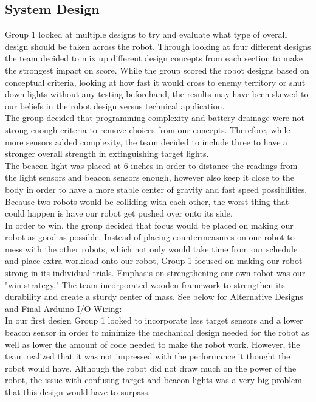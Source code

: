 \documentclass{article}
\begin{document}
\subsection{System Design}
Group 1 looked at multiple designs to try and evaluate what type of overall design should be taken across the robot. Through looking at four different designs the team decided to mix up different design concepts from each section to make the strongest impact on score. While the group scored the robot designs based on conceptual criteria, looking at how fast it would cross to enemy territory or shut down lights without any testing beforehand, the results may have been skewed to our beliefs in the robot design versus technical application. \\

The group decided that programming complexity and battery drainage were not strong enough criteria to remove choices from our concepts. Therefore, while more sensors added complexity, the team decided to include three to have a stronger overall strength in extinguishing target lights. \\

The beacon light was placed at 6 inches in order to distance the readings from the light sensors and beacon sensors enough, however also keep it close to the body in order to have a more stable center of gravity and fast speed possibilities. Because two robots would be colliding with each other, the worst thing that could happen is have our robot get pushed over onto its side. \\

In order to win, the group decided that focus would be placed on making our robot as good as possible. Instead of placing countermeasures on our robot to mess with the other robots, which not only would take time from our schedule and place extra workload onto our robot, Group 1 focused on making our robot strong in its individual trials. Emphasis on strengthening our own robot was our "win strategy." The team incorporated wooden framework to strengthen its durability and create a sturdy center of mass. See below for Alternative Designs and Final Arduino I/O Wiring: \\

In our first design Group 1 looked to incorporate less target sensors and a lower beacon sensor in order to minimize the mechanical design needed for the robot as well as lower the amount of code needed to make the robot work. However, the team realized that it was not impressed with the performance it thought the robot would have. Although the robot did not draw much on the power of the robot, the issue with confusing target and beacon lights was a very big problem that this design would have to surpass.\\
\end{document}
